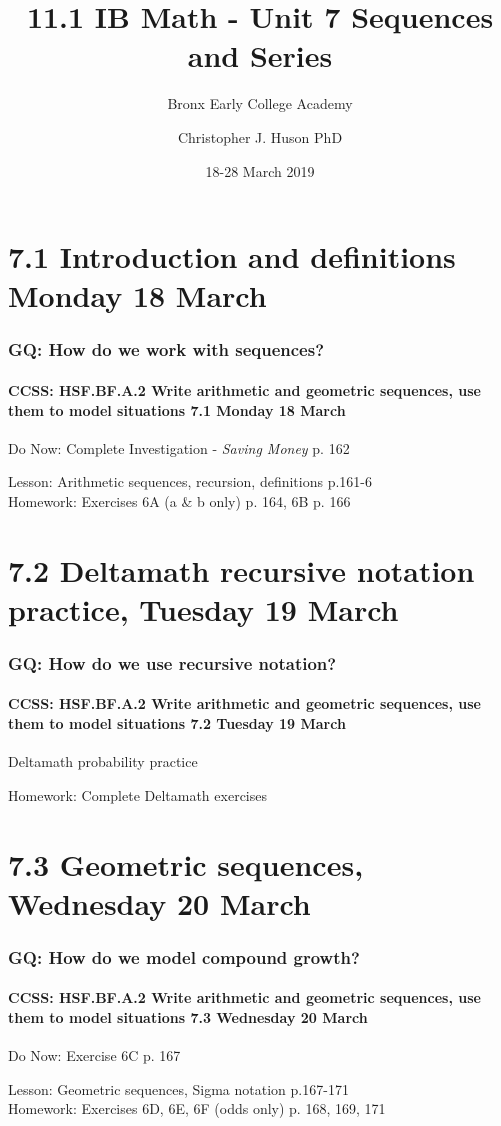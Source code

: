 \documentclass{beamer}
\title{11.1 IB Math - Unit 7 Sequences and Series}
\subtitle{Bronx Early College Academy}
\author{Christopher J. Huson PhD}
\date{18-28 March 2019}
\begin{document}
\frame{\titlepage}

\section[Outline]{}
\frame{\tableofcontents}

\section{7.1 Introduction and definitions Monday 18 March}
  \frame
  {
    \frametitle{GQ: How do we work with sequences?}
    \framesubtitle{CCSS: HSF.BF.A.2 Write arithmetic and geometric sequences, use them to model situations \hfill \alert{7.1 Monday 18 March}}

    \begin{block}{Do Now: Complete Investigation - \emph{Saving Money} p. 162}
    \end{block}
    Lesson: Arithmetic sequences, recursion, definitions p.161-6\\[1cm]
    Homework: Exercises 6A (a \& b only) p. 164, 6B p. 166
  }

  \section{7.2 Deltamath recursive notation practice, Tuesday 19 March}
    \frame
    {
      \frametitle{GQ: How do we use recursive notation?}
      \framesubtitle{CCSS: HSF.BF.A.2 Write arithmetic and geometric sequences, use them to model situations \hfill \alert{7.2 Tuesday 19 March}}

      \begin{block}{Deltamath probability practice}
      \end{block}
      Homework: Complete Deltamath exercises
    }

  \section{7.3 Geometric sequences, Wednesday 20 March}
    \frame
    {
      \frametitle{GQ: How do we model compound growth?}
      \framesubtitle{CCSS: HSF.BF.A.2 Write arithmetic and geometric sequences, use them to model situations \hfill \alert{7.3 Wednesday 20 March}}

      \begin{block}{Do Now: Exercise 6C p. 167}
      \end{block}
      Lesson: Geometric sequences, Sigma notation p.167-171\\[1cm]
      Homework: Exercises 6D, 6E, 6F (odds only) p. 168, 169, 171
    }
\end{document}
